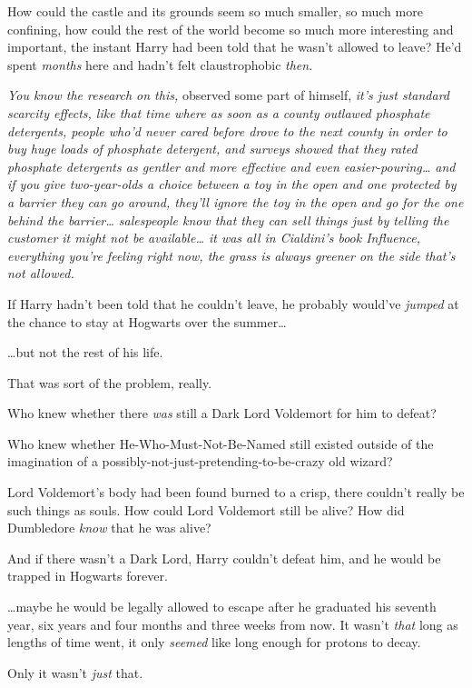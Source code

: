 How could the castle and its grounds seem so much smaller, so much more confining, how could the rest of the world become so much more interesting and important, the instant Harry had been told that he wasn't allowed to leave? He'd spent \emph{months} here and hadn't felt claustrophobic \emph{then}.

\emph{You \emph{know} the research on this,} observed some part of himself, \emph{it's just standard scarcity effects, like that time where as soon as a county outlawed phosphate detergents, people who'd never cared before drove to the next county in order to buy huge loads of phosphate detergent, and surveys showed that they rated phosphate detergents as gentler and more effective and even easier-pouring{\ldots} and if you give two-year-olds a choice between a toy in the open and one protected by a barrier they can go around, they'll ignore the toy in the open and go for the one behind the barrier{\ldots} salespeople know that they can sell things just by telling the customer it might not be available{\ldots} it was all in Cialdini's book \emph{Influence,} everything you're feeling right now, the grass is always greener on the side that's not allowed.}

If Harry hadn't been told that he couldn't leave, he probably would've \emph{jumped} at the chance to stay at Hogwarts over the summer{\ldots}

{\ldots}but not the rest of his life.

That was sort of the problem, really.

Who knew whether there \emph{was} still a Dark Lord Voldemort for him to defeat?

Who knew whether He-Who-Must-Not-Be-Named still existed outside of the imagination of a possibly-not-just-pretending-to-be-crazy old wizard?

Lord Voldemort's body had been found burned to a crisp, there couldn't really be such things as souls. How could Lord Voldemort still be alive? How did Dumbledore \emph{know} that he was alive?

And if there wasn't a Dark Lord, Harry couldn't defeat him, and he would be trapped in Hogwarts forever.

{\ldots}maybe he would be legally allowed to escape after he graduated his seventh year, six years and four months and three weeks from now. It wasn't \emph{that} long as lengths of time went, it only \emph{seemed} like long enough for protons to decay.

Only it wasn't \emph{just} that.

